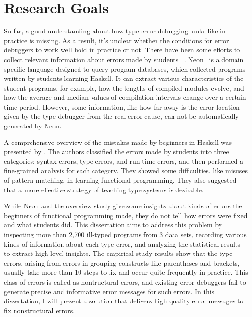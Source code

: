 \documentclass[12pt]{report}	%
\begin{document}


\section{Research Goals}

So far, a good understanding about how type error debugging looks like
in practice is missing. As a result, it's unclear whether the conditions
for error debuggers to work well hold in practice or not.
%
There have been some efforts to collect relevant
information about errors made by students
~\cite{Hage09:Neon,tirronen2015understanding,chambers2012function,fenwick2009another,denny2012all}.
Neon~\cite{Hage09:Neon} is a domain specific language designed to query
program databases, which collected programs written by students learning Haskell.
It can extract various characteristics of the student programs,
for example, how the lengths of compiled modules evolve,
and how the average and median values of compilation intervals
change over a certain time period.
However, some information, like how far away is 
the error location
given by the type debugger from the real error cause,
can not be automatically generated by Neon.

A comprehensive overview of the mistakes made by beginners in Haskell was presented by \cite{tirronen2015understanding}.
The authors classified the errors made by students into three
categories: syntax errors, type errors, and run-time errors,
and then performed a fine-grained analysis for each category.
They showed some difficulties, like misuses of pattern matching,
in learning functional programming.
They also suggested that a more effective strategy of teaching type systems
is desirable.


While Neon and the overview study give some insights about kinds of errors the beginners of
functional programming made, they do not tell how errors were fixed and what students did.
%
This dissertation aims to address this problem by inspecting more than 2,700
ill-typed programs from 3 data sets,
recording various kinds of information about each type error, 
and analyzing the statistical results to extract high-level insights.
%
The empirical study results show that the type errors, arising from errors in grouping constructs like parentheses and brackets,
usually take more than 10 steps to fix and occur quite frequently in practice.
This class of errors is called as nontructural errors,
and existing error debuggers fail to generate precise and informative error messages for such errors.
In this dissertation, I will present a solution that delivers high quality error messages to fix nonstructural errors.
\end{document}
